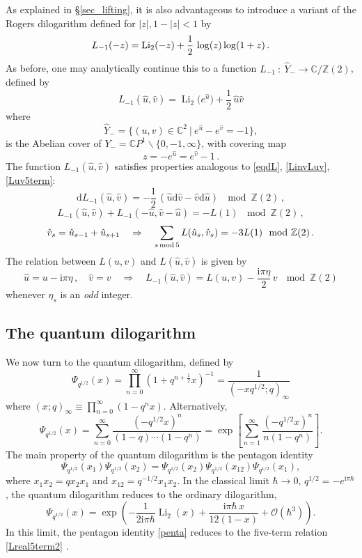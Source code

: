 \documentclass[12pt,reqno]{article}
\numberwithin{equation}{section}
\DeclareMathOperator{\Li}{Li}
\newcommand{\be}{\begin{equation}}
\newcommand{\ee}{\end{equation}}
\newcommand{\CP}{\IC P^1}
\newcommand{\de}{\mathrm{d}}
\newcommand{\I}{\mathrm{i}}
\newcommand{\cO}{\mathcal{O}}
\newcommand{\IC}{\mathbb{C}}
\newcommand{\IZ}{\mathbb{Z}}
\def\qli2#1{\Psi_{#1}}
\def\hu{\hat u}
\def\hv{\hat v}
\def\ind{s}
\numberwithin{equation}{section}
\begin{document}
As explained in \S \ref{sec_lifting}, it is also advantageous to introduce a variant of the
Rogers dilogarithm defined for $|z|,1-|z|<1$ by
\be
\label{defrogersvA}
L_{-1}(-z) = {\rm Li}_2(-z)+\frac12 \,\log (z) \log(1+z)\,  .
\ee
As before, one may analytically continue this to a function $L_{-1}\ :\ \hat{Y}_-\to \mathbb{C}/\mathbb{Z}(2)$,
defined by
\be
L_{-1}(\hu,\hv) = \Li_2\big( e^{\hu}\big) + \frac12\, \hu \hv
\ee
where
\be
\hat Y_- = \{ (u,v)\in\IC^2 \ \vert \ e^{\hu} - e^{\hv}=-1\},
\ee
is the Abelian cover  of $Y_-=\CP\backslash\{0,-1,\infty\}$, with covering map
\be
z=-e^{\hu}=e^{\hv}-1\, .
\ee
The function $L_{-1}(\hat u,\hat v)$ satisfies properties analogous to \eqref{eqdL},
\eqref{LinvLuv}, \eqref{Luv5term}:
\be
\label{dlm1uv}
\de L_{-1}(\hu,\hv) = -\frac12\, ( \hu \de \hv- \hv\de \hu) \ \mod \IZ(2)\, ,
\ee
\be
\label{funclm1}
L_{-1}(\hu,\hv) + L_{-1}(-\hu,\hv-\hu) = -L(1) \, \mod \IZ(2)\, ,
\ee
\be
\label{Luvm15term}
\hat v_\ind = \hat u_{\ind-1} + \hat u_{\ind+1}\quad \Rightarrow\quad
\sum_{\ind\, {\rm mod}\, 5} L(\hat u_\ind,\hat v_\ind) =
-3L(1) \mod \IZ(2)\, .
\ee
The relation between $L(u,v)$ and $L(\hu, \hv)$ is given by
\be
\label{Lm1vsL}
\hu = u- \I\pi \eta\, ,
\quad
\hv=v \quad \Rightarrow \quad L_{-1}(\hu,\hv) =
L(u,v) -\frac{\I\pi\eta}{2}\, v\ \mod \IZ(2)
\ee
whenever $\eta_s$ is an {\it odd} integer.



\subsection{The quantum dilogarithm}

We now turn to the quantum dilogarithm, defined by \cite{Faddeev:1993rs}
\be
\qli2{q^{1/2}}(x) =
\prod_{n=0}^{\infty} (1+q^{n+\frac12} x)^{-1}= \frac{1}{\left( -x q^{1/2};q\right)_\infty}
\label{defqdilog}
\ee
where $(x;q)_\infty\equiv \prod_{n=0}^{\infty}(1-q^n x)$.
Alternatively,
\be
\qli2{q^{1/2}}(x) = \sum_{n=0}^{\infty} \frac{(-q^{1/2} x)^n}{(1-q)\cdots (1-q^n)}
= \exp\left[ \sum_{n=1}^{\infty} \frac{(-q^{1/2} x)^n}{n(1-q^n)}\right].
\label{qdilog}
\ee
The main property of the quantum dilogarithm is the pentagon identity
\be
\label{penta}
\qli2{q^{1/2}}(x_1) \qli2{q^{1/2}}(x_2) = \qli2{q^{1/2}}(x_2) \qli2{q^{1/2}}(x_{12}) \qli2{q^{1/2}}(x_1),
\ee
where $x_1 x_2=q x_2 x_1$ and $x_{12}=q^{-1/2} x_1 x_2$.
In the classical limit $\hbar \to 0$, $q^{1/2}=-e^{\I\pi\hbar}$, the quantum dilogarithm
reduces to the ordinary dilogarithm,
\be
\label{qli2clas}
\qli2{q^{1/2}}(x) = \exp\left( -\frac{1}{2\I\pi\hbar} \Li_2(x) +  \frac{\I \pi  \hbar\, x}{12(1-x)}
+\cO(\hbar^3) \right).
\ee
In this limit,  the pentagon identity \eqref{penta}
reduces to the five-term relation \eqref{Lreal5term2}  \cite{Faddeev:1993rs}.
\end{document}

